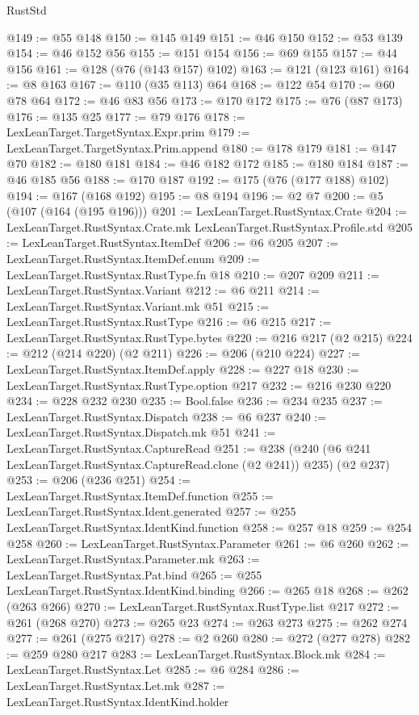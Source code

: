 \begin{lexlean}{RustStd}
\begin{coremodule}
@149 := @55 @148
@150 := @145 @149
@151 := @46 @150
@152 := @53 @139
@154 := @46 @152 @56
@155 := @151 @154
@156 := @69 @155
@157 := @44 @156
@161 := @128 (@76 (@143 @157) @102)
@163 := @121 (@123 @161)
@164 := @8 @163
@167 := @110 (@35 @113) @64
@168 := @122 @54
@170 := @60 @78 @64
@172 := @46 @83 @56
@173 := @170 @172
@175 := @76 (@87 @173)
@176 := @135 @25
@177 := @79 @176
@178 := LexLeanTarget.TargetSyntax.Expr.prim
@179 := LexLeanTarget.TargetSyntax.Prim.append
@180 := @178 @179
@181 := @147 @70
@182 := @180 @181
@184 := @46 @182 @172
@185 := @180 @184
@187 := @46 @185 @56
@188 := @170 @187
@192 := @175 (@76 (@177 @188) @102)
@194 := @167 (@168 @192)
@195 := @8 @194
@196 := @2 @7
@200 := @5 (@107 (@164 (@195 @196)))
@201 := LexLeanTarget.RustSyntax.Crate
@204 := LexLeanTarget.RustSyntax.Crate.mk LexLeanTarget.RustSyntax.Profile.std
@205 := LexLeanTarget.RustSyntax.ItemDef
@206 := @6 @205
@207 := LexLeanTarget.RustSyntax.ItemDef.enum
@209 := LexLeanTarget.RustSyntax.RustType.fn @18
@210 := @207 @209
@211 := LexLeanTarget.RustSyntax.Variant
@212 := @6 @211
@214 := LexLeanTarget.RustSyntax.Variant.mk @51
@215 := LexLeanTarget.RustSyntax.RustType
@216 := @6 @215
@217 := LexLeanTarget.RustSyntax.RustType.bytes
@220 := @216 @217 (@2 @215)
@224 := @212 (@214 @220) (@2 @211)
@226 := @206 (@210 @224)
@227 := LexLeanTarget.RustSyntax.ItemDef.apply
@228 := @227 @18
@230 := LexLeanTarget.RustSyntax.RustType.option @217
@232 := @216 @230 @220
@234 := @228 @232 @230
@235 := Bool.false
@236 := @234 @235
@237 := LexLeanTarget.RustSyntax.Dispatch
@238 := @6 @237
@240 := LexLeanTarget.RustSyntax.Dispatch.mk @51
@241 := LexLeanTarget.RustSyntax.CaptureRead
@251 := @238 (@240 (@6 @241 LexLeanTarget.RustSyntax.CaptureRead.clone (@2 @241)) @235) (@2 @237)
@253 := @206 (@236 @251)
@254 := LexLeanTarget.RustSyntax.ItemDef.function
@255 := LexLeanTarget.RustSyntax.Ident.generated
@257 := @255 LexLeanTarget.RustSyntax.IdentKind.function
@258 := @257 @18
@259 := @254 @258
@260 := LexLeanTarget.RustSyntax.Parameter
@261 := @6 @260
@262 := LexLeanTarget.RustSyntax.Parameter.mk
@263 := LexLeanTarget.RustSyntax.Pat.bind
@265 := @255 LexLeanTarget.RustSyntax.IdentKind.binding
@266 := @265 @18
@268 := @262 (@263 @266)
@270 := LexLeanTarget.RustSyntax.RustType.list @217
@272 := @261 (@268 @270)
@273 := @265 @23
@274 := @263 @273
@275 := @262 @274
@277 := @261 (@275 @217)
@278 := @2 @260
@280 := @272 (@277 @278)
@282 := @259 @280 @217
@283 := LexLeanTarget.RustSyntax.Block.mk
@284 := LexLeanTarget.RustSyntax.Let
@285 := @6 @284
@286 := LexLeanTarget.RustSyntax.Let.mk
@287 := LexLeanTarget.RustSyntax.IdentKind.holder

\end{coremodule}
\end{lexlean}
